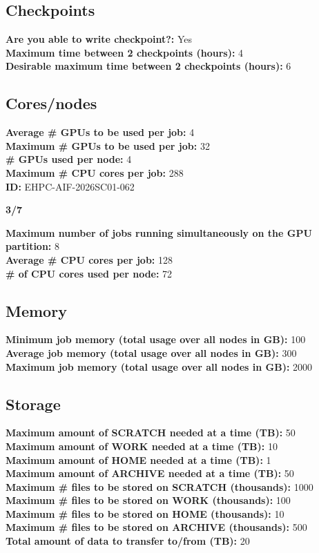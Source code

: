 \documentclass[11pt, a4paper]{article}
\begin{document}
\subsection*{Checkpoints}

\noindent\textbf{Are you able to write checkpoint?:} Yes \\
\textbf{Maximum time between 2 checkpoints (hours):} 4 \\
\textbf{Desirable maximum time between 2 checkpoints (hours):} 6

\subsection*{Cores/nodes}

\noindent\textbf{Average \# GPUs to be used per job:} 4 \\
\textbf{Maximum \# GPUs to be used per job:} 32 \\
\textbf{\# GPUs used per node:} 4 \\
\textbf{Maximum \# CPU cores per job:} 288 \\
\textbf{ID:} EHPC-AIF-2026SC01-062

\vspace{0.5em}
\noindent\textbf{3/7}

\vspace{0.5em}
\noindent\textbf{Maximum number of jobs running simultaneously on the GPU partition:} 8 \\
\textbf{Average \# CPU cores per job:} 128 \\
\textbf{\# of CPU cores used per node:} 72

\subsection*{Memory}

\noindent\textbf{Minimum job memory (total usage over all nodes in GB):} 100 \\
\textbf{Average job memory (total usage over all nodes in GB):} 300 \\
\textbf{Maximum job memory (total usage over all nodes in GB):} 2000

\subsection*{Storage}

\noindent\textbf{Maximum amount of SCRATCH needed at a time (TB):} 50 \\
\textbf{Maximum amount of WORK needed at a time (TB):} 10 \\
\textbf{Maximum amount of HOME needed at a time (TB):} 1 \\
\textbf{Maximum amount of ARCHIVE needed at a time (TB):} 50 \\
\textbf{Maximum \# files to be stored on SCRATCH (thousands):} 1000 \\
\textbf{Maximum \# files to be stored on WORK (thousands):} 100 \\
\textbf{Maximum \# files to be stored on HOME (thousands):} 10 \\
\textbf{Maximum \# files to be stored on ARCHIVE (thousands):} 500 \\
\textbf{Total amount of data to transfer to/from (TB):} 20
\end{document}
